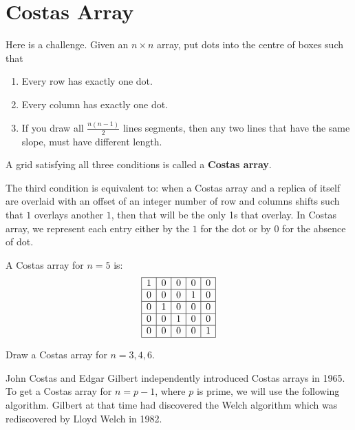 \section{Costas Array}
Here is a challenge. Given an $ n\times n $ array, put dots into the centre of
boxes such that
\begin{enumerate}[(1)]
    \item Every row has exactly one dot.
    \item Every column has exactly one dot.
    \item If you draw all $\frac{n(n-1)}{2}$ lines segments, then any two lines that have the same slope, must have different length.
\end{enumerate}
A grid satisfying all three conditions is called a \textbf{Costas array}.

The third condition is equivalent to: when a Costas array and a replica of itself
are overlaid with an offset of an integer number of row and columns shifts such that
$1$ overlays another $1$, then that will be the only 1s that overlay.
In Costas array, we represent each entry either by the $1$ for the dot or by $0$ for
the absence of dot.

\begin{Example}{}{}
    A Costas array for $ n=5 $ is:
    \[ \begin{array}{|c|c|c|c|c|}%
            \hline%
            1 & 0 & 0 & 0 & 0 \\
            \hline%
            0 & 0 & 0 & 1 & 0 \\
            \hline%
            0 & 1 & 0 & 0 & 0 \\
            \hline%
            0 & 0 & 1 & 0 & 0 \\
            \hline%
            0 & 0 & 0 & 0 & 1 \\
            \hline%
        \end{array} \]
\end{Example}
\begin{Exercise}{}{}
    Draw a Costas array for $ n=3,4,6 $.
\end{Exercise}
John Costas and Edgar Gilbert independently introduced Costas arrays in 1965.
To get a Costas array for $n = p- 1$, where $p$ is prime, we will use the following
algorithm. Gilbert at that time had discovered the Welch algorithm which was
rediscovered by Lloyd Welch in 1982.

